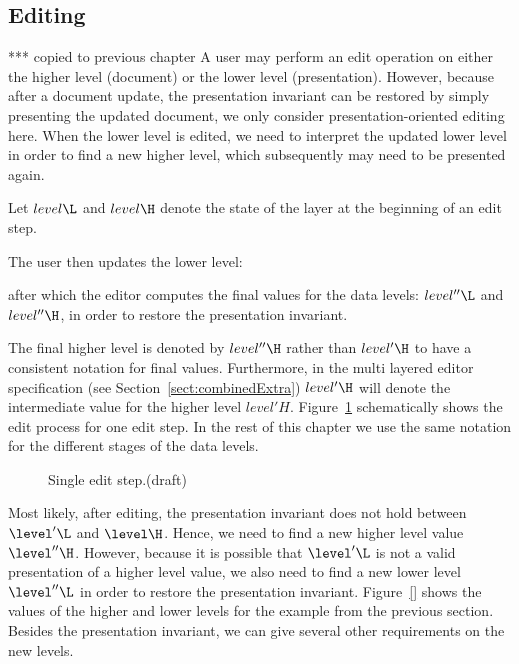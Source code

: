 

\subsection{Editing}\label{sect:single_Editing}

*** copied to previous chapter
A user may perform an edit operation on either the higher level (document) or the lower level (presentation). However, because after a document update, the presentation invariant can be restored by simply presenting the updated document, we only consider presentation-oriented editing here. When the lower level is edited, we need to interpret the updated lower level in order to find a new higher level, which subsequently may need to be presented again.


Let $level\L$ and $level\H$ denote the state of the layer at the beginning of an edit step. 


The user then updates the lower level:


after which the editor computes the final values for the data levels: $level''\L$ and $level''\H$, in order to restore the presentation invariant.

\bc The final higher level is denoted by $level''\H$ rather than $level'\H$ to have a consistent notation for final values. Furthermore, in the multi layered editor specification (see Section~\ref{sect:combinedExtra}) $level'\H$ will denote the intermediate value for the higher level $level'H$. Figure~\ref{singleLayerEdit} schematically shows the edit process for one edit step. In the rest of this chapter we use the same notation for the different stages of the data levels.

\begin{figure}
\caption{Single edit step.(draft)} \label{singleLayerEdit}
\end{figure}


Most likely, after editing, the presentation invariant does not hold between $\level'\L$ and $\level\H$. Hence, we need to find a new higher level value $\level''\H$. However, because it is possible that $\level'\L$ is not a valid presentation of a higher level value, we also need to find a new lower level $\level''\L$ in order to restore the presentation invariant. Figure~\ref{} shows the values of the higher and lower levels for the example from the previous section.
\ec 
Besides the presentation invariant, we can give several other requirements on the new levels.

